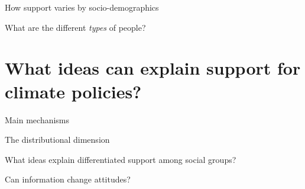 \begin{framefont}{\small}
\begin{frame}{How support varies by socio-demographics}
\end{frame}

\begin{frame}{What are the different \textit{types} of people?}
\end{frame}


\section{What ideas can explain support for climate policies?}

\begin{frame}{Main mechanisms}
\end{frame}

\begin{frame}{The distributional dimension}
\end{frame}

\begin{frame}{What ideas explain differentiated support among social groups?}
\end{frame}

\begin{frame}{Can information change attitudes?}
\end{frame}


\end{framefont}
